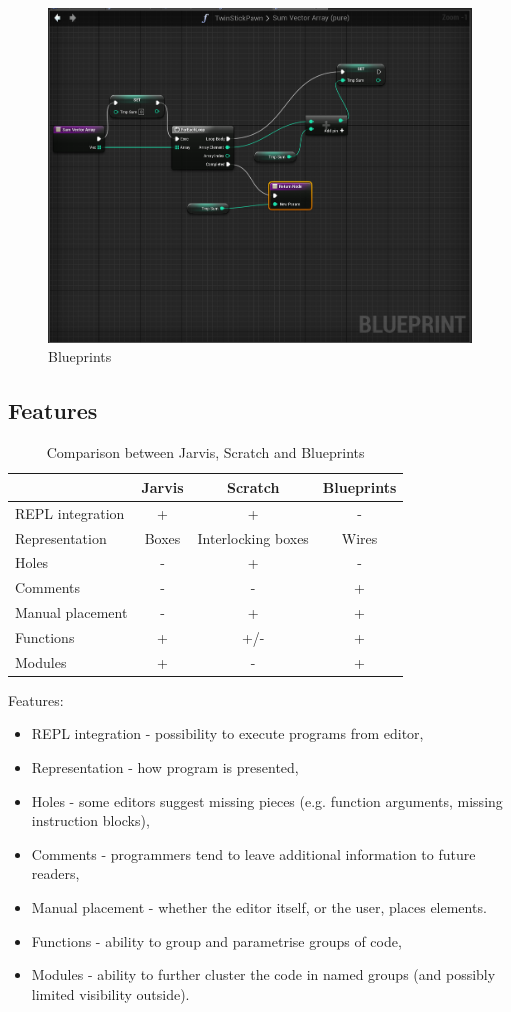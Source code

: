 \documentclass[11pt]{scrartcl}
\begin{document}
\begin{figure}[hbt]
  \includegraphics[scale=0.3]{img/b-wires}
  \caption{Blueprints}
  \label{blueprints}
\end{figure}


\subsection{Features}
\begin{table}[hbt]
  \begin{tabular}{l|ccc}
    & Jarvis & Scratch & Blueprints \\
    \hline
    REPL integration & + & + & - \\
    Representation & Boxes & Interlocking boxes & Wires \\
    Holes & - & + & - \\
    Comments & - & - & + \\
    Manual placement & - & + & + \\
    Functions & + & +/- & + \\
    Modules & + & - & + \\
  \end{tabular}
  \caption{Comparison between Jarvis, Scratch and Blueprints}
\end{table}
Features:
\begin{itemize}
  \item REPL integration - possibility to execute programs from editor,
  \item Representation - how program is presented,
  \item Holes - some editors suggest missing pieces (e.g. function arguments, missing instruction blocks),
  \item Comments - programmers tend to leave additional information to future readers,
  \item Manual placement - whether the editor itself, or the user, places elements.
  \item Functions - ability to group and parametrise groups of code,
  \item Modules - ability to further cluster the code in named groups (and possibly limited visibility outside).
\end{itemize}
\end{document}
